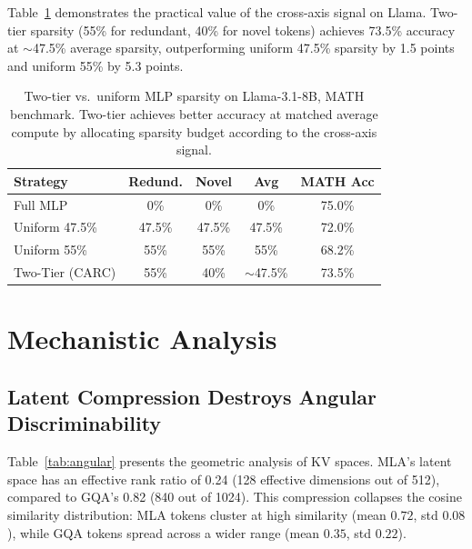 \documentclass[11pt,a4paper]{article}
\begin{document}
Table~\ref{tab:two-tier} demonstrates the practical value of the cross-axis signal on Llama.
Two-tier sparsity (55\% for redundant, 40\% for novel tokens) achieves 73.5\% accuracy at $\sim$47.5\% average sparsity, outperforming uniform 47.5\% sparsity by 1.5 points and uniform 55\% by 5.3 points.

\begin{table}[t]
\centering
\small
\begin{tabular}{lcccc}
\toprule
\textbf{Strategy} & \textbf{Redund.} & \textbf{Novel} & \textbf{Avg} & \textbf{MATH Acc} \\
\midrule
Full MLP      & 0\%   & 0\%   & 0\%    & 75.0\% \\
Uniform 47.5\% & 47.5\% & 47.5\% & 47.5\% & 72.0\% \\
Uniform 55\%   & 55\%  & 55\%  & 55\%   & 68.2\% \\
Two-Tier (CARC) & 55\%  & 40\%  & $\sim$47.5\% & 73.5\% \\
\bottomrule
\end{tabular}
\caption{Two-tier vs.\ uniform MLP sparsity on Llama-3.1-8B, MATH benchmark. Two-tier achieves better accuracy at matched average compute by allocating sparsity budget according to the cross-axis signal.}
\label{tab:two-tier}
\end{table}

\section{Mechanistic Analysis}
\label{sec:mechanistic}

\subsection{Latent Compression Destroys Angular Discriminability}
\label{sec:latent}

Table~\ref{tab:angular} presents the geometric analysis of KV spaces.
MLA's latent space has an effective rank ratio of 0.24 (128 effective dimensions out of 512), compared to GQA's 0.82 (840 out of 1024).
This compression collapses the cosine similarity distribution: MLA tokens cluster at high similarity (mean $0.72$, std $0.08$), while GQA tokens spread across a wider range (mean $0.35$, std $0.22$).
\end{document}
